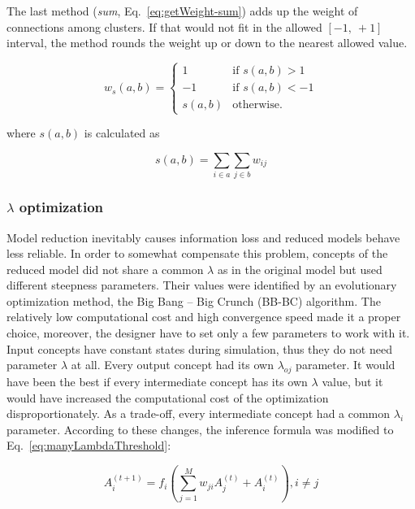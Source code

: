 \documentclass[graybox]{svmult}
\begin{document}
The last method (\emph{sum}, Eq.~\ref{eq:getWeight-sum}) adds up the 
weight of connections among clusters. If that would not fit in the 
allowed $[-1,~+1]$ interval, the method rounds the weight up or 
down to the nearest allowed value.

\begin{equation}
  \label{eq:getWeight-sum}
  w_s(a,b) = \left\{ \begin{array}{ll}
                       1 & \textrm{if } s(a,b) > 1 \\
                       -1 & \textrm{if } s(a,b) < -1 \\
                       s(a,b) & \textrm{otherwise.}
                     \end{array} \right.
\end{equation}

\noindent where $s(a,b)$ is calculated as

\begin{equation}
  \label{eq:sum}
  s(a,b) = \sum_{i \in a} \sum_{j \in b} w_{ij}
\end{equation}

\subsubsection{$\lambda$ optimization}
\label{sec:lambdaOptimization}

Model reduction inevitably causes information loss and reduced 
models behave less reliable. In order to somewhat compensate this 
problem, concepts of the reduced model did not share a common 
$\lambda$ as in the original model but used different steepness 
parameters. Their values were identified by an evolutionary 
optimization method, the Big Bang -- Big Crunch (BB-BC) \cite
{yesilenginurbasleon2010} algorithm. The relatively low 
computational cost and high convergence speed made it a proper choice, 
moreover, the designer have to set only a few parameters to work 
with it. Input concepts have constant states during simulation, thus 
they do not need parameter $\lambda$ at all. Every output concept 
had its own $\lambda_{oj}$ parameter. It would have been the best if 
every intermediate concept has its own $\lambda$ value, but it 
would have increased the computational cost of the optimization 
disproportionately. As a trade-off, every intermediate concept had a 
common $\lambda_{i}$ parameter. According to these changes, the 
inference formula was modified to Eq.~\ref{eq:manyLambdaThreshold}:

\begin{equation}
  \label{eq:manyLambdaThreshold}
  A_i^{(t+1)} = f_i\left(\sum_{j=1}^{M} w_{ji}A_j^{(t)} + A_i^{(t)}\right), i \neq j
\end{equation}
\end{document}
